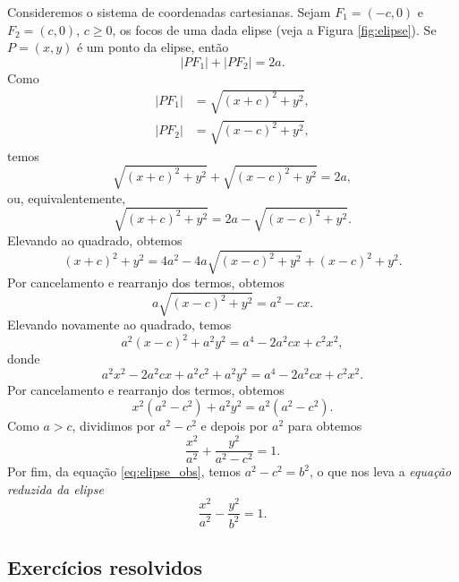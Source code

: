 Consideremos o sistema de coordenadas cartesianas. Sejam $F_1=(-c,0)$ e $F_2=(c,0)$, $c\geq 0$, os focos de uma dada elipse (veja a Figura \ref{fig:elipse}).  Se $P=(x,y)$ é um ponto da elipse, então
\begin{equation}
  |PF_1| + |PF_2| = 2a.
\end{equation}
Como
\begin{align}
  |PF_1| &= \sqrt{(x+c)^2 + y^2}, \\
  |PF_2| &= \sqrt{(x-c)^2 + y^2},
\end{align}
temos
\begin{equation}
  \sqrt{(x+c)^2 + y^2} + \sqrt{(x-c)^2 + y^2} = 2a,
\end{equation}
ou, equivalentemente,
\begin{equation}
  \sqrt{(x+c)^2 + y^2} = 2a - \sqrt{(x-c)^2 + y^2}.
\end{equation}
Elevando ao quadrado, obtemos
\begin{equation}
  (x+c)^2 + y^2 = 4a^2 - 4a\sqrt{(x-c)^2+y^2} + (x-c)^2+y^2.
\end{equation}
Por cancelamento e rearranjo dos termos, obtemos
\begin{equation}
  a\sqrt{(x-c)^2+y^2}=a^2-cx.
\end{equation}
Elevando novamente ao quadrado, temos
\begin{equation}
  a^2(x-c)^2+a^2y^2=a^4-2a^2cx+c^2x^2,
\end{equation}
donde
\begin{equation}
  a^2x^2 -2a^2cx + a^2c^2 + a^2y^2= a^4 -2a^2cx + c^2x^2.
\end{equation}
Por cancelamento e rearranjo dos termos, obtemos
\begin{equation}
  x^2(a^2 - c^2) + a^2y^2 = a^2(a^2 - c^2).
\end{equation}
Como $a>c$, dividimos por $a^2-c^2$  e depois por $a^2$ para obtemos
\begin{equation}
  \frac{x^2}{a^2} + \frac{y^2}{a^2-c^2} = 1.
\end{equation}
Por fim, da equação \eqref{eq:elipse_obs}, temos $a^2-c^2 = b^2$, o que nos leva  a \emph{equação reduzida da elipse}
\begin{equation}
  \frac{x^2}{a^2} - \frac{y^2}{b^2} = 1.
\end{equation}

\subsection*{Exercícios resolvidos}

